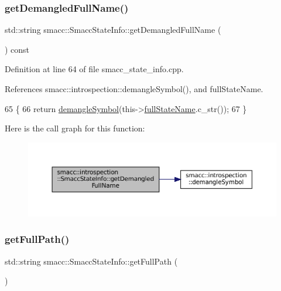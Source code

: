 \subsubsection{\texorpdfstring{get\+Demangled\+Full\+Name()}{getDemangledFullName()}}
{\footnotesize\ttfamily std\+::string smacc\+::\+Smacc\+State\+Info\+::get\+Demangled\+Full\+Name (\begin{DoxyParamCaption}{ }\end{DoxyParamCaption}) const}



Definition at line 64 of file smacc\+\_\+state\+\_\+info.\+cpp.



References smacc\+::introspection\+::demangle\+Symbol(), and full\+State\+Name.


\begin{DoxyCode}
65 \{
66     \textcolor{keywordflow}{return} \hyperlink{namespacesmacc_1_1introspection_a2f495108db3e57604d8d3ff5ef030302}{demangleSymbol}(this->\hyperlink{classsmacc_1_1introspection_1_1SmaccStateInfo_aef6053863f757bf9af16fe4da75c51de}{fullStateName}.c\_str());
67 \}
\end{DoxyCode}
Here is the call graph for this function\+:
\nopagebreak
\begin{figure}[H]
\begin{center}
\leavevmode
\includegraphics[width=350pt]{classsmacc_1_1introspection_1_1SmaccStateInfo_a76899507f734e549df07363ba910e94d_cgraph}
\end{center}
\end{figure}
\mbox{\label{classsmacc_1_1introspection_1_1SmaccStateInfo_a22e625806a74808ee272df5c034d122e}} 
\subsubsection{\texorpdfstring{get\+Full\+Path()}{getFullPath()}}
{\footnotesize\ttfamily std\+::string smacc\+::\+Smacc\+State\+Info\+::get\+Full\+Path (\begin{DoxyParamCaption}{ }\end{DoxyParamCaption})}



